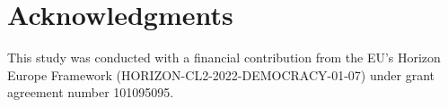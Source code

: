 
\newpage

\section*{Acknowledgments}
This study was conducted with a financial contribution from the EU’s Horizon Europe Framework (HORIZON-CL2-2022-DEMOCRACY-01-07) under grant agreement number 101095095.